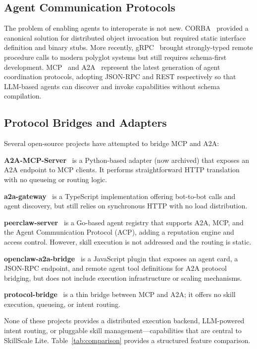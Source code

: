\documentclass[sigconf,nonacm]{acmart}
\begin{document}
\subsection{Agent Communication Protocols}

The problem of enabling agents to interoperate is not new. CORBA~\cite{corba1995} provided a canonical solution for distributed object invocation but required static interface definition and binary stubs. More recently, gRPC~\cite{grpc2016} brought strongly-typed remote procedure calls to modern polyglot systems but still requires schema-first development. MCP~\cite{mcp2024} and A2A~\cite{a2a2025} represent the latest generation of agent coordination protocols, adopting JSON-RPC and REST respectively so that LLM-based agents can discover and invoke capabilities without schema compilation.

\subsection{Protocol Bridges and Adapters}

Several open-source projects have attempted to bridge MCP and A2A:

\textbf{A2A-MCP-Server}~\cite{a2amcpserver2024} is a Python-based adapter (now archived) that exposes an A2A endpoint to MCP clients. It performs straightforward HTTP translation with no queueing or routing logic.

\textbf{a2a-gateway}~\cite{a2agateway2024} is a TypeScript implementation offering bot-to-bot calls and agent discovery, but still relies on synchronous HTTP with no load distribution.

\textbf{peerclaw-server}~\cite{peerclaw2024} is a Go-based agent registry that supports A2A, MCP, and the Agent Communication Protocol (ACP), adding a reputation engine and access control. However, skill execution is not addressed and the routing is static.

\textbf{openclaw-a2a-bridge}~\cite{openclaw2024} is a JavaScript plugin that exposes an agent card, a JSON-RPC endpoint, and remote agent tool definitions for A2A protocol bridging, but does not include execution infrastructure or scaling mechanisms.

\textbf{protocol-bridge}~\cite{protocolbridge2024} is a thin bridge between MCP and A2A; it offers no skill execution, queueing, or intent routing.

None of these projects provides a distributed execution backend, LLM-powered intent routing, or pluggable skill management---capabilities that are central to SkillScale Lite. Table~\ref{tab:comparison} provides a structured feature comparison.
\end{document}

